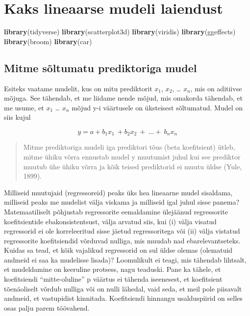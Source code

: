 \documentclass[]{book}
\newenvironment{Shaded}{\begin{snugshade}}{\end{snugshade}}
\newcommand{\KeywordTok}[1]{\textcolor[rgb]{0.13,0.29,0.53}{\textbf{#1}}}
\newcommand{\NormalTok}[1]{#1}
\begin{document}
\chapter{Kaks lineaarse mudeli
laiendust}\label{kaks-lineaarse-mudeli-laiendust}

\begin{Shaded}
\begin{Highlighting}[]
\KeywordTok{library}\NormalTok{(tidyverse)}
\KeywordTok{library}\NormalTok{(scatterplot3d)}
\KeywordTok{library}\NormalTok{(viridis)}
\KeywordTok{library}\NormalTok{(ggeffects)}
\KeywordTok{library}\NormalTok{(broom)}
\KeywordTok{library}\NormalTok{(car)}
\end{Highlighting}
\end{Shaded}

\section{Mitme sõltumatu prediktoriga
mudel}\label{mitme-soltumatu-prediktoriga-mudel}

Esiteks vaatame mudelit, kus on mitu prediktorit \(x_1\), \(x_2\),
\ldots{} \(x_n\), mis on aditiivse mõjuga. See tähendab, et me liidame
nende mõjud, mis omakorda tähendab, et me usume, et \(x_1\) \ldots{}
\(x_n\) mõjud y-i väärtusele on üksteisest sõltumatud. Mudel on siis
kujul

\[y = a + b_1x_1~ + b_2x_2~ +~ ... +~ b_nx_n\]

\begin{quote}
Mitme prediktoriga mudeli iga prediktori tõus (beta koefitsient) ütleb,
mitme ühiku võrra ennustab mudel y muutumist juhul kui see prediktor
muutub ühe ühiku võrra ja kõik teised prediktorid ei muutu üldse (Yule,
1899).
\end{quote}

Milliseid muutujaid (regressoreid) peaks üks hea lineaarne mudel
sisaldama, milliseid peaks me mudelist välja viskama ja milliseid igal
juhul sisse panema? Matemaatiliselt põhjustab regressorite eemaldamine
ülejäänud regressorite koefitsientide ebakonsistentsust, välja arvatud
siis, kui (i) välja visatud regressorid ei ole korreleeritud sisse
jäetud regressoritega või (ii) välja vistatud regressorite koefitsiendid
võrduvad nulliga, mis muudab nad ebarelevantseteks. Kuidas sa tead, et
kõik vajalikud regressorid on sul üldse olemas (olematuid andmeid ei saa
ka mudelisse lisada)? Loomulikult ei teagi, mis tähendab lihtsalt, et
mudeldamine on keeruline protsess, nagu teaduski. Pane ka tähele, et
koefitsiendi ``mitte-oluline'' p väärtus ei tähenda iseenesest, et
koefitsient tõenäoliselt võrdub nulliga või on nulli lähedal, vaid seda,
et meil pole piisavalt andmeid, et vastupidist kinnitada. Koefitsiendi
hinnangu usalduspiirid on selles osas palju parem töövahend.
\end{document}
